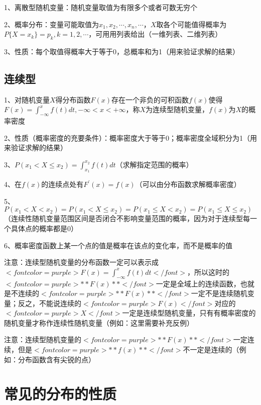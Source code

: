 1、离散型随机变量：随机变量取值为有限多个或者可数无穷个

2、概率分布：变量可能取值为$ x_1,x_2,\cdots,x_n,\cdots $，$ X $取各个可能值得概率为$ P\{ X = x_k \} = p_k, k=1,2,\cdots $，可用用列表给出（一维列表、二维列表）

3、性质：每个取值得概率大于等于0，总概率和为1（用来验证求解的结果）



\subsection{连续型}

1、对随机变量$ X $得分布函数$ F(x) $存在一个非负的可积函数$ f(x) $使得$ F(x)=\int_{-\infty}^xf(t)dt,-\infty <x<+\infty $，称$ X $为连续型随机变量，$ f(x) $为$ X $的概率密度

2、性质（概率密度的充要条件）：概率密度大于等于0；概率密度全域积分为1（用来验证求解的结果）

3、$ P(x_1 < X \le x_2) = \int_{x_1}^{x_2}f(t)dt $（求解指定范围的概率）

4、在$ f(x) $的连续点处有$ F^{'}(x)=f(x) $（可以由分布函数求解概率密度）

5、$ P(x_1 < X < x_2) = P(x_1 < X \le x_2) = P(x_1 \le X < x_2) = P(x_1 \le X \le x_2) $（连续性随机变量范围区间是否闭合不影响变量范围的概率，因为对于连续型每一个具体点的概率都是0）

6、概率密度函数上某一个点的值是概率在该点的变化率，而不是概率的值

注意：连续型随机变量的分布函数一定可以表示成$ <font color=purple>F(x)=\int_{-\infty}^xf(t)dt</font> $，所以这时的$ <font color=purple>**F(x)**</font> $一定是全域上的连续函数，也就是不连续的$ <font color=purple>**F(x)**</font> $一定不是连续随机变量；反之，不能说连续的$ <font color=purple>F(x)</font> $对应的$ <font color=purple>X</font> $一定是连续型随机变量，只有有概率密度的随机变量才称作连续性随机变量（例如：这里需要补充反例）

注意：连续型随机变量的$ <font color=purple>**F(x)**</font> $一定连续，但是$ <font color=purple>**f(x)**</font> $不一定是连续的（例如：分布函数含有尖锐的点）



\section{常见的分布的性质}



